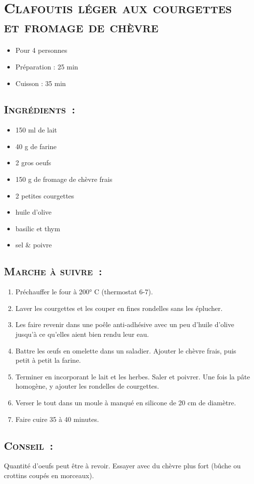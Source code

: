 \section[\normalsize{Clafoutis l\'eger aux courgettes et fromage de ch\`evre}]{\LARGE{\textsc{Clafoutis l\'eger aux courgettes et fromage de ch\`evre}}}		%


\begin{itemize}
\item Pour 4 personnes
\item Préparation : 25 min
\item Cuisson : 35 min
\end{itemize}

\subsection*{\textsc{Ingr\'edients~:}}

\begin{itemize}
\item 150 ml de lait
\item 40 g de farine
\item 2 gros oeufs
\item 150 g de fromage de ch\`evre frais
\item 2 petites courgettes
\item huile d'olive 
\item basilic et thym
\item sel \& poivre 
\end{itemize}


\subsection*{\textsc{Marche \`a suivre~:}}

\begin{enumerate}
\item Pr\'echauffer le four \`a 200° C (thermostat 6-7).

\item Laver les courgettes et les couper en fines rondelles sans les \'eplucher.

\item Les faire revenir dans une po\^ele anti-adh\'esive avec un peu d'huile d'olive jusqu'\`a ce qu'elles aient bien rendu leur eau.

\item Battre les œufs en omelette dans un saladier. Ajouter le ch\`evre frais, puis petit \`a petit la farine.

\item Terminer en incorporant le lait et les herbes. Saler et poivrer. Une fois la p\^ate homog\`ene, y ajouter les rondelles de courgettes.

\item Verser le tout dans un moule \`a manqu\'e en silicone de 20 cm de diam\`etre.

\item Faire cuire 35 \`a 40 minutes. 
\end{enumerate}
\subsection*{\textsc{Conseil~:}}

Quantit\'e d'oeufs peut \^etre \`a revoir.
Essayer avec du ch\`evre plus fort (bûche ou crottins coup\'es en morceaux).
